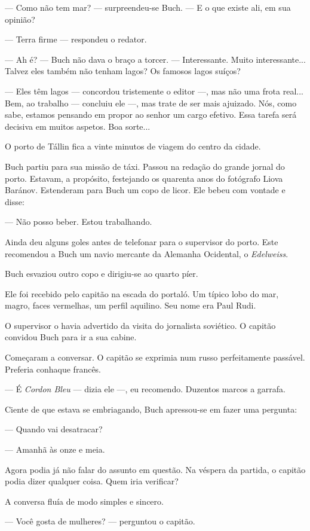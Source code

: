 --- Como não tem mar? --- surpreendeu-se Buch. --- E o que existe ali,
em sua opinião?

--- Terra firme --- respondeu o redator.

--- Ah é? --- Buch não dava o braço a torcer. --- Interessante. Muito
interessante... Talvez eles também não tenham lagos? Os famosos lagos
suíços?

--- Eles têm lagos --- concordou tristemente o editor ---, mas não uma
frota real... Bem, ao trabalho --- concluiu ele ---, mas trate de ser
mais ajuizado. Nós, como sabe, estamos pensando em propor ao senhor um
cargo efetivo. Essa tarefa será decisiva em muitos aspetos. Boa sorte...

O porto de Tállin fica a vinte minutos de viagem do centro da cidade.

Buch partiu para sua missão de táxi. Passou na redação do grande jornal
do porto. Estavam, a propósito, festejando os quarenta anos do fotógrafo
Liova Baránov. Estenderam para Buch um copo de licor. Ele bebeu com
vontade e disse:

--- Não posso beber. Estou trabalhando.

Ainda deu alguns goles antes de telefonar para o supervisor do porto.
Este recomendou a Buch um navio mercante da Alemanha Ocidental, o
\emph{Edelweiss}.

Buch esvaziou outro copo e dirigiu-se ao quarto píer.

Ele foi recebido pelo capitão na escada do portaló. Um típico lobo do
mar, magro, faces vermelhas, um perfil aquilino. Seu nome era Paul Rudi.

O supervisor o havia advertido da visita do jornalista soviético. O
capitão convidou Buch para ir a sua cabine.

Começaram a conversar. O capitão se exprimia num russo perfeitamente
passável. Preferia conhaque francês.

--- É \emph{Cordon Bleu} --- dizia ele ---, eu recomendo. Duzentos
marcos a garrafa.

Ciente de que estava se embriagando, Buch apressou-se em fazer uma
pergunta:

--- Quando vai desatracar?

--- Amanhã às onze e meia.

Agora podia já não falar do assunto em questão. Na véspera da partida, o
capitão podia dizer qualquer coisa. Quem iria verificar?

A conversa fluía de modo simples e sincero.

--- Você gosta de mulheres? --- perguntou o capitão.

